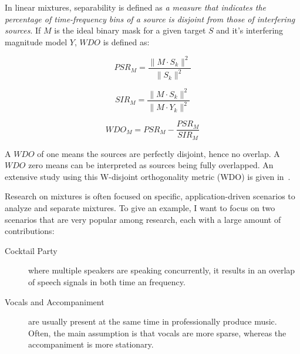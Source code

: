 In linear mixtures, separability is defined as \emph{a measure that indicates the percentage of time-frequency bins of a source is disjoint from those of interfering sources}.
If \(M\) is the ideal binary mask for a given target \(S\) and it's interfering
magnitude model \(Y\), \(WDO\) is defined as:

\begin{equation}
    PSR_{M} = \frac{\|M \cdot S_{k}\|^{2}}{\|S_{k}\|^{2}}
\end{equation}

\begin{equation}
    SIR_{M}=\frac{\|M \cdot S_{k}\|^{2}}{\|M \cdot Y_{k}\|^{2}}
\end{equation}

\begin{equation}
    WDO_{M} = PSR_{M} - \frac{PSR_{M}}{SIR_{M}}
\end{equation}


A \(WDO\) of one means the sources are perfectly disjoint, hence no overlap.
A \(WDO\) zero means can be interpreted as sources being fully overlapped.
An extensive study using this W-disjoint orthogonality metric (WDO) is given in~\cite{rickard02}.
\par
Research on mixtures is often focused on specific, application-driven scenarios to analyze and separate mixtures.
To give an example, I want to focus on two scenarios that are very popular among research, each with a large amount of contributions:

\begin{description}
  \item[Cocktail Party] where multiple speakers are speaking concurrently, it results in an overlap of speech signals in both time an frequency. 
  \item[Vocals and Accompaniment] are usually present at the same time in professionally produce music. 
  Often, the main assumption is that vocals are more sparse, whereas the accompaniment is more stationary.
\end{description}

